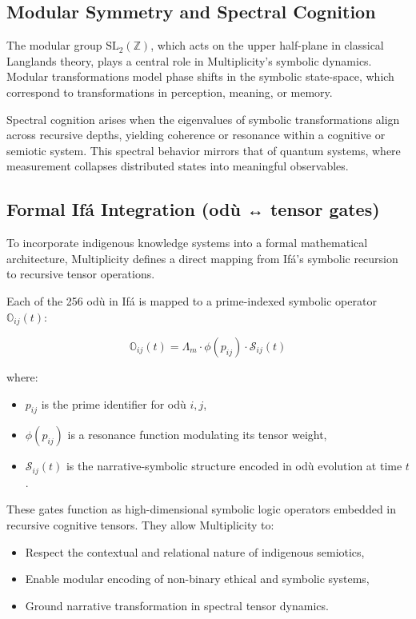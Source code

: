 \documentclass{article}
\theoremstyle{plain}
\begin{document}
\subsection{Modular Symmetry and Spectral Cognition}

The modular group \( \text{SL}_2(\mathbb{Z}) \), which acts on the upper half-plane in classical Langlands theory, plays a central role in Multiplicity’s symbolic dynamics. Modular transformations model phase shifts in the symbolic state-space, which correspond to transformations in perception, meaning, or memory.

Spectral cognition arises when the eigenvalues of symbolic transformations align across recursive depths, yielding coherence or resonance within a cognitive or semiotic system. This spectral behavior mirrors that of quantum systems, where measurement collapses distributed states into meaningful observables.

\subsection{Formal Ifá Integration (odù ↔ tensor gates)}

To incorporate indigenous knowledge systems into a formal mathematical architecture, Multiplicity defines a direct mapping from Ifá's symbolic recursion to recursive tensor operations.

Each of the 256 odù in Ifá is mapped to a prime-indexed symbolic operator \( \mathbb{O}_{ij}(t) \):

\[
\mathbb{O}_{ij}(t) = \Lambda_m \cdot \phi(p_{ij}) \cdot \mathcal{S}_{ij}(t)
\]

where:
\begin{itemize}
    \item \( p_{ij} \) is the prime identifier for odù \( i,j \),
    \item \( \phi(p_{ij}) \) is a resonance function modulating its tensor weight,
    \item \( \mathcal{S}_{ij}(t) \) is the narrative-symbolic structure encoded in odù evolution at time \( t \).
\end{itemize}

These gates function as high-dimensional symbolic logic operators embedded in recursive cognitive tensors. They allow Multiplicity to:
\begin{itemize}
    \item Respect the contextual and relational nature of indigenous semiotics,
    \item Enable modular encoding of non-binary ethical and symbolic systems,
    \item Ground narrative transformation in spectral tensor dynamics.
\end{itemize}
\end{document}
